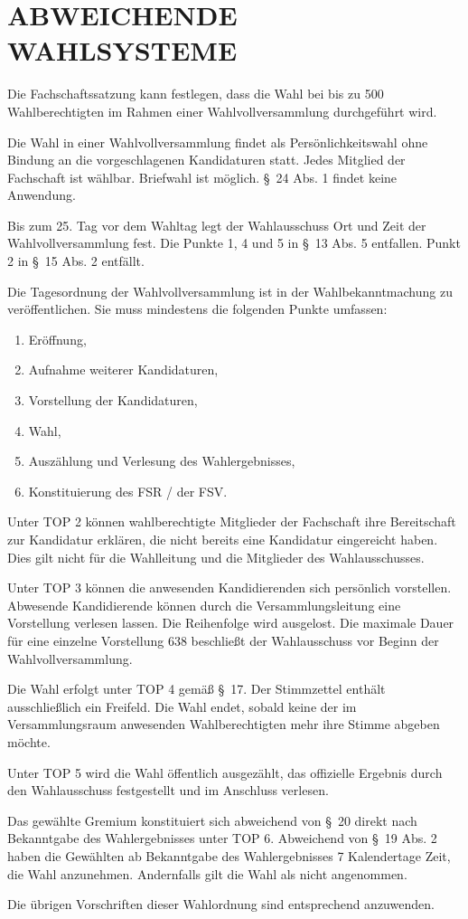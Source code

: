 \documentclass[%
draft,%
multilinesections%
]{fswo}
\begin{document}
\section{ABWEICHENDE WAHLSYSTEME}
\begin{contract}
\label{cls-wahlvollversammlung}
Die Fachschaftssatzung kann festlegen, dass die Wahl bei bis zu 500 Wahlberechtigten im Rahmen einer Wahlvollversammlung durchgeführt wird.

Die Wahl in einer Wahlvollversammlung findet als Persönlichkeitswahl ohne Bindung an die vorgeschlagenen Kandidaturen statt.
Jedes Mitglied der Fachschaft ist wählbar.
Briefwahl ist möglich.
\S~24 Abs. 1 findet keine Anwendung.

Bis zum 25. Tag vor dem Wahltag legt der Wahlausschuss Ort und Zeit der Wahlvollversammlung fest.
Die Punkte 1, 4 und 5 in \S~13 Abs. 5 entfallen. Punkt 2 in \S~15 Abs. 2 entfällt.

Die Tagesordnung der Wahlvollversammlung ist in der Wahlbekanntmachung zu veröffentlichen.
Sie muss mindestens die folgenden Punkte umfassen:
\begin{enumerate}
\item Eröffnung,
\item Aufnahme weiterer Kandidaturen,
\item Vorstellung der Kandidaturen,
\item Wahl,
\item Auszählung und Verlesung des Wahlergebnisses,
\item Konstituierung des FSR / der FSV.
\end{enumerate}

Unter TOP 2 können wahlberechtigte Mitglieder der Fachschaft ihre Bereitschaft zur Kandidatur erklären, die nicht bereits eine Kandidatur eingereicht haben.
Dies gilt nicht für die Wahlleitung und die Mitglieder des Wahlausschusses.

Unter TOP 3 können die anwesenden Kandidierenden sich persönlich vorstellen.
Abwesende Kandidierende können durch die Versammlungsleitung eine Vorstellung verlesen lassen.
Die Reihenfolge wird ausgelost.
Die maximale Dauer für eine einzelne Vorstellung 638 beschließt der Wahlausschuss vor Beginn der Wahlvollversammlung.

Die Wahl erfolgt unter TOP 4 gemäß \S~17.
Der Stimmzettel enthält ausschließlich ein Freifeld.
Die Wahl endet, sobald keine der im Versammlungsraum anwesenden Wahlberechtigten mehr ihre Stimme abgeben möchte.

Unter TOP 5 wird die Wahl öffentlich ausgezählt, das offizielle Ergebnis durch den Wahlausschuss festgestellt und im Anschluss verlesen.

Das gewählte Gremium konstituiert sich abweichend von \S~20 direkt nach Bekanntgabe des Wahlergebnisses unter TOP 6.
Abweichend von \S~19 Abs. 2 haben die Gewählten ab Bekanntgabe des Wahlergebnisses 7 Kalendertage Zeit, die Wahl anzunehmen.
Andernfalls gilt die Wahl als nicht angenommen.

Die übrigen Vorschriften dieser Wahlordnung sind entsprechend anzuwenden.
\end{contract}
\end{document}
